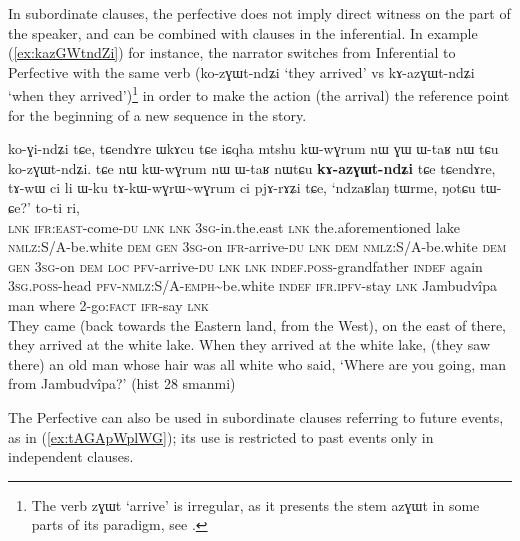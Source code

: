 \documentclass[oldfontcommands,oneside,a4paper,11pt]{article}
\newcommand{\ipa}[1]{{\phon \mbox{#1}}} %
\newcommand{\refb}[1]{(\ref{#1})}
\newcommand{\factual}[1]{\textsc{:fact}}
\newcommand{\rdp}{\textasciitilde{}}
\begin{document}
In subordinate clauses, the perfective does not imply direct witness on the part of the speaker, and can be combined with clauses in the inferential. In example \refb{ex:kazGWtndZi} for instance, the narrator switches from Inferential to Perfective with the same verb (\ipa{ko-zɣɯt-ndʑi} `they arrived' vs \ipa{kɤ-azɣɯt-ndʑi} `when they arrived')\footnote{The verb \ipa{zɣɯt} `arrive' is irregular, as it presents the stem \ipa{azɣɯt} in some parts of its paradigm, see \citet[424]{jacques04these}. } in order to make the action (the arrival) the reference point for the beginning of a new sequence in the story.

\begin{exe}
\ex \label{ex:kazGWtndZi}
\gll \ipa{tɕendɤre} 	\ipa{ko-ɣi-ndʑi} 	\ipa{tɕe,} 	\ipa{tɕendɤre} 	\ipa{ɯkɤcu} 	\ipa{tɕe} 	\ipa{iɕqha} 	\ipa{mtshu} 	\ipa{kɯ-wɣrum} 	\ipa{nɯ} 	\ipa{ɣɯ} 	\ipa{ɯ-taʁ} 	\ipa{nɯ} \ipa{tɕu} 	\ipa{ko-zɣɯt-ndʑi.} \ipa{tɕe} 	\ipa{nɯ} 	\ipa{kɯ-wɣrum} 	\ipa{nɯ} 	\ipa{ɯ-taʁ} 	\ipa{nɯtɕu} 	\textbf{\ipa{kɤ-azɣɯt-ndʑi}} 	\ipa{tɕe} 	\ipa{tɕendɤre,} 
\ipa{tɤ-wɯ} 	\ipa{ci} 	\ipa{li} 	\ipa{ɯ-ku} 	\ipa{tɤ-kɯ-wɣrɯ\rdp{}wɣrum} 	\ipa{ci} 	\ipa{pjɤ-rɤʑi} \ipa{tɕe,} \ipa{`ndzaʁlaŋ} 	\ipa{tɯrme,} 	\ipa{ŋotɕu} 	\ipa{tɯ-ɕe?'} 	\ipa{to-ti} 	\ipa{ri,} \\
\textsc{lnk} \textsc{ifr:east}-come-\textsc{du} \textsc{lnk}  \textsc{lnk} \textsc{3sg}-in.the.east  \textsc{lnk} the.aforementioned lake \textsc{nmlz}:S/A-be.white \textsc{dem} \textsc{gen} \textsc{3sg}-on \textsc{ifr}-arrive-\textsc{du} \textsc{lnk} \textsc{dem} \textsc{nmlz}:S/A-be.white \textsc{dem} \textsc{gen} \textsc{3sg}-on \textsc{dem} \textsc{loc} \textsc{pfv}-arrive-\textsc{du}  \textsc{lnk}  \textsc{lnk} \textsc{indef.poss}-grandfather \textsc{indef} again \textsc{3sg.poss}-head \textsc{pfv}-\textsc{nmlz}:S/A-\textsc{emph}\rdp{}be.white  \textsc{indef} \textsc{ifr.ipfv}-stay   \textsc{lnk} Jambudvîpa man where 2-go\factual{} \textsc{ifr}-say \textsc{lnk} \\
\glt They came (back towards the Eastern land, from the West), on the east of there, they arrived at the white lake. When they arrived at the white lake, (they saw there) an old man whose hair was all white who said, `Where are you going, man from Jambudvîpa?' (hist 28 smanmi)
\end{exe}

The Perfective can also be used in subordinate clauses referring to future events, as in \refb{ex:tAGApWplWG}; its use is restricted to past events only in independent clauses.
\end{document}
